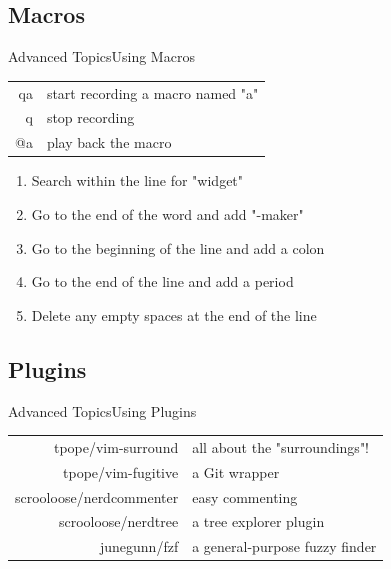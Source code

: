 \documentclass{beamer}
\begin{document}
\subsection{Macros}
\begin{frame}[c]{Advanced Topics}{Using Macros}
    \begin{table}[htpb]
        \centering
        \begin{tabular}{r|l}
            qa & start recording a macro named "a" \\
            q  & stop recording \\
            @a & play back the macro \\
        \end{tabular}
    \end{table}

    \begin{enumerate}
        \item Search within the line for "widget" \\
        \item Go to the end of the word and add "-maker" \\
        \item Go to the beginning of the line and add a colon \\
        \item Go to the end of the line and add a period \\
        \item Delete any empty spaces at the end of the line \\
    \end{enumerate}
\end{frame}


\subsection{Plugins}
\begin{frame}[c]{Advanced Topics}{Using Plugins}
    \begin{table}[htpb]
        \centering
        \begin{tabular}{r|l}
            tpope/vim-surround & all about the "surroundings"!  \\
            tpope/vim-fugitive & a Git wrapper \\
            scrooloose/nerdcommenter & easy commenting \\
            scrooloose/nerdtree & a tree explorer plugin \\
            junegunn/fzf & a general-purpose fuzzy finder \\
        \end{tabular}
    \end{table}
\end{frame}
\end{document}
